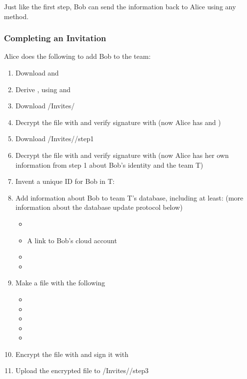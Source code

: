 \documentclass[pldi,10pt,preprint]{sigplanconf-pldi16}
\begin{document}
Just like the first step, Bob can send the information back to Alice using any method.

\subsubsection{Completing an Invitation}

Alice does the following to add Bob to the team:

\begin{enumerate}
\item Download  and 
\item Derive , using  and 
\item Download \slash Invites\slash {}
\item Decrypt the file with  and verify signature with  (now Alice has  and )
\item Download \slash Invites\slash {}\slash step1
\item Decrypt the file with  and verify signature with  (now Alice has her own information from step 1 about Bob's identity and the team T)
\item Invent a unique ID for Bob in T: 
\item Add information about Bob to team T's database, including at least: (more information about the database update protocol below)
  \begin{itemize}
  \item {}
  \item A link to Bob's cloud account
  \item {}
  \item {}
  \end{itemize}
\item Make a file with the following
  \begin{itemize}
  \item {}
  \item {}
  \item {}
  \item {}
  \item {}
  \end{itemize}
\item Encrypt the file with  and sign it with 
\item Upload the encrypted file to \slash Invites\slash {}\slash step3
\end{enumerate}
\end{document}

